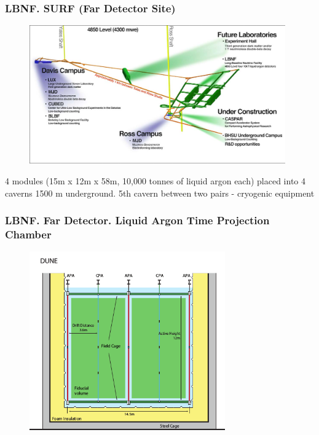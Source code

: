 \begin{frame}\frametitle{LBNF. SURF (Far Detector Site)}
\begin{figure}
\label{fig:farDetector_SURF2}
\centering
\includegraphics[width=0.98\textwidth, keepaspectratio=true]{figs/farDetector_wholeLab.png}
\end{figure}
\scriptsize
4 modules (15m x 12m x 58m, 10,000 tonnes of liquid argon each) placed into 4 caverns 1500 m underground. 5th cavern between two pairs - cryogenic equipment\\
\end{frame}

\begin{frame}\frametitle{LBNF. Far Detector. Liquid Argon Time Projection Chamber}
\begin{figure}
\label{fig:farDetector_TPC}
\centering
\includegraphics[width=0.75\textwidth, keepaspectratio=true]{figs/farDetector_TPC.png}
\end{figure}
\end{frame}

